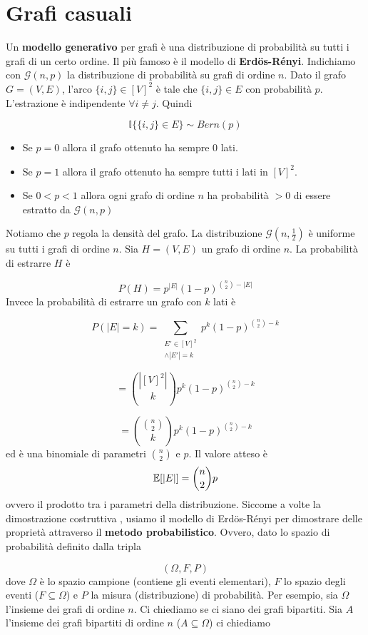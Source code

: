 \documentclass[12pt]{report}
\begin{document}
\section{Grafi casuali}
Un \textbf{modello generativo} per grafi è una distribuzione di probabilità su tutti i grafi di un certo ordine. Il più famoso è il modello di \textbf{Erd\"{o}s-Rényi}. Indichiamo con $\mathscr{G}(n,p) $ la distribuzione di probabilità su grafi di ordine $n$. Dato il grafo $G = (V,E)$, l'arco $\{i,j\} \in [V ]^2$ è tale che $\{i,j\} \in E$ con probabilità $p$. L'estrazione è indipendente  $\forall i \neq j$. Quindi 

$$\mathds{I}\{\{i,j\} \in E\} \sim Bern(p)$$
\begin{itemize}
    \item Se $p = 0$ allora il grafo ottenuto ha sempre $0$ lati.
    \item Se $p = 1$ allora il grafo ottenuto ha sempre tutti i lati in $[V]^2$.
    \item Se $0 < p < 1$ allora ogni grafo di ordine $n$ ha probabilità $> 0$ di essere estratto da $\mathscr{G}(n,p)$
\end{itemize}

\noindent
Notiamo che $p$ regola la densità del grafo.
La distribuzione $\mathscr{G}(n,\frac{1}{2})$ è uniforme su tutti i grafi di ordine $n$. 
Sia $H = (V,E)$ un grafo di ordine $n$. La probabilità di estrarre $H$ è 

$$ P(H) = p^{|E|} (1-p)^{\binom{n}{2} - |E|}$$ 
Invece la probabilità di estrarre un grafo con $k$ lati è 

$$P(|E| = k) = \sum_{\substack{ E' \in [V]^2 \\ \land |E'| = k}} p^k (1-p)^{\binom{n}{2} - k}$$

$$= \binom{|[V]^2|}{k}p^k (1-p)^{\binom{n}{2} - k}$$

$$= \binom{\binom{n}{2}}{k}p^k (1-p)^{\binom{n}{2} - k}$$
ed è una binomiale di parametri $\binom{n}{2}$ e $p$. Il valore atteso è $$\mathbb{E}[|E|] = \binom{n}{2}p$$ ovvero il prodotto tra i parametri della distribuzione.
Siccome a volte la dimostrazione costruttiva , usiamo il modello di Erd\"{o}s-Rényi per dimostrare delle proprietà attraverso il \textbf{metodo probabilistico}. Ovvero, dato lo spazio di probabilità definito dalla tripla

 $$(\Omega,F,P)$$
dove $\Omega$ è lo spazio campione (contiene gli eventi elementari), $F$ lo spazio degli eventi ($F \subseteq \Omega$) e $P$ la misura (distribuzione) di probabilità. Per esempio, sia $\Omega$ l'insieme dei grafi di ordine $n$. Ci chiediamo se ci siano dei grafi bipartiti.  Sia $A$ l'insieme dei grafi bipartiti di ordine $n$ ($A \subseteq \Omega $) ci chiediamo
\end{document}
